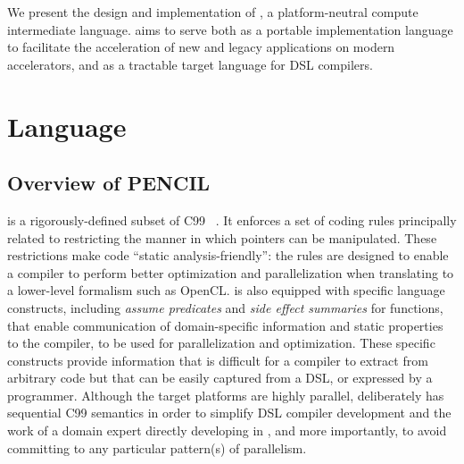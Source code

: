 % 

We present the design and implementation of \pencil, a plat\-form-neu\-tral 
compute intermediate language.
\pencil aims to serve both as a portable implementation language to facilitate 
the acceleration of new and legacy applications on modern accelerators, and as 
a tractable target language for DSL compilers.


\section{\pencil Language}

\subsection{Overview of PENCIL \label{pencil-overview}}

\pencil is a rigorously-defined subset of C99~\cite{c99}
.  It enforces a set of
coding rules principally related to restricting the manner in which pointers
can be manipulated.  These restrictions make \pencil code
``static analysis-friendly'': the rules are designed to enable a compiler
to perform better optimization and parallelization when translating \pencil
to a lower-level formalism such as OpenCL.
\pencil is also equipped with specific language constructs, including
\emph{assume predicates} and \emph{side effect summaries} for functions,
that enable communication of domain-specific information and static properties
to the \pencil compiler, to be used for parallelization and optimization.
These specific constructs provide information that is difficult for a
compiler to extract from arbitrary code but that can be easily captured from a DSL, or
expressed by a programmer.
Although the target platforms are highly parallel,
\pencil deliberately has sequential C99 semantics in order to simplify DSL
compiler development and the work of a domain expert directly
developing in \pencil, and more importantly, to avoid committing to
any particular pattern(s) of parallelism.

